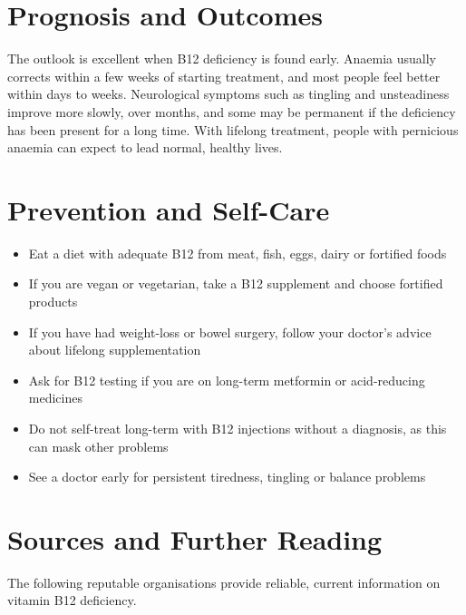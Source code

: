 \section*{Prognosis and Outcomes}
The outlook is excellent when B12 deficiency is found early. Anaemia usually corrects within a few weeks of starting treatment, and most people feel better within days to weeks. Neurological symptoms such as tingling and unsteadiness improve more slowly, over months, and some may be permanent if the deficiency has been present for a long time. With lifelong treatment, people with pernicious anaemia can expect to lead normal, healthy lives.

\section*{Prevention and Self-Care}
\begin{itemize}
    \item Eat a diet with adequate B12 from meat, fish, eggs, dairy or fortified foods
    \item If you are vegan or vegetarian, take a B12 supplement and choose fortified products
    \item If you have had weight-loss or bowel surgery, follow your doctor's advice about lifelong supplementation
    \item Ask for B12 testing if you are on long-term metformin or acid-reducing medicines
    \item Do not self-treat long-term with B12 injections without a diagnosis, as this can mask other problems
    \item See a doctor early for persistent tiredness, tingling or balance problems
\end{itemize}

\section*{Sources and Further Reading}
The following reputable organisations provide reliable, current information on vitamin B12 deficiency.

